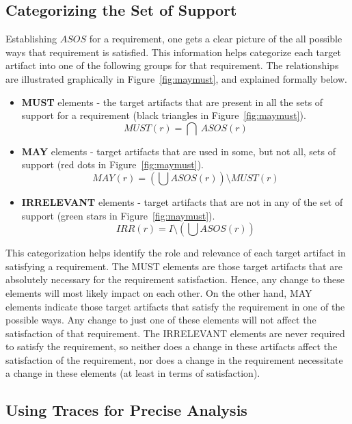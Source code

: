 \subsection{Categorizing the Set of Support}

Establishing $ASOS$ for a requirement, one gets a clear picture of the all possible ways that requirement is satisfied. This information helps categorize each target artifact into one of the following groups for that requirement.  The relationships are illustrated graphically in Figure~\ref{fig:maymust}, and explained formally below.
\begin{itemize}
  \item \textbf{MUST} elements - the target artifacts that are present in all the sets of support for a requirement (black triangles in Figure~\ref{fig:maymust}).
      $$ MUST (r) = \bigcap \ ASOS(r) $$

  \item \textbf{MAY} elements - target artifacts that are used in some, but not all, sets of support (red dots in Figure~\ref{fig:maymust}).
      $$MAY(r) = (\bigcup ASOS (r)) \setminus MUST (r) $$

  \item \textbf{IRRELEVANT} elements - target artifacts that are not in any of the set of support (green stars in Figure~\ref{fig:maymust}). $$IRR(r) = I \setminus (\bigcup ASOS (r))$$
\end{itemize}

This categorization helps identify the role and relevance of each target artifact in satisfying a requirement. The MUST elements are those target artifacts that are absolutely necessary for the requirement satisfaction. Hence, any change to these elements will most likely impact on each other. On the other hand, MAY elements indicate those target artifacts that satisfy the requirement in one of the possible ways.  Any change to just one of these elements will not affect the satisfaction of that requirement. The IRRELEVANT elements are never required to satisfy the requirement, so neither does a change in these artifacts affect the satisfaction of the requirement, nor does a change in the requirement necessitate a change in these elements (at least in terms of satisfaction).


\subsection{Using Traces for Precise Analysis}

